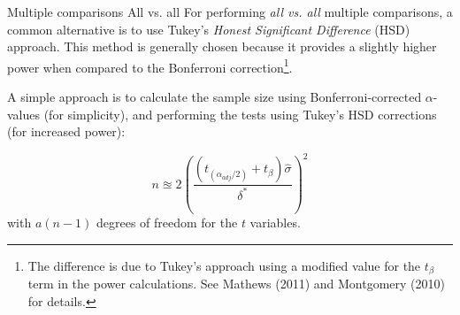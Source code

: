 \begin{frame}
{Multiple comparisons}
{All vs. all}
For performing \textit{all vs. all} multiple comparisons, a common alternative is to use Tukey's \textit{Honest Significant Difference} (HSD) approach. This method is generally chosen because it provides a slightly higher power when compared to the Bonferroni correction\footnote[4]{\tiny The difference is due to Tukey's approach using a modified value for the $t_{\beta}$ term in the power calculations. See Mathews (2011) and Montgomery (2010) for details.}.\bigskip

A simple approach is to calculate the sample size using Bonferroni-corrected $\alpha$-values (for simplicity), and performing the tests using Tukey's HSD corrections (for increased power):

\begin{equation*}
n \approxeq 2\left(\frac{\left(t_{(\alpha_{adj}/2)}+t_{\beta}\right)\hat{\sigma}}{\delta^*}\right)^2
\end{equation*}
\noindent with $a(n-1)$ degrees of freedom for the $t$ variables.
\end{frame}
%
%
